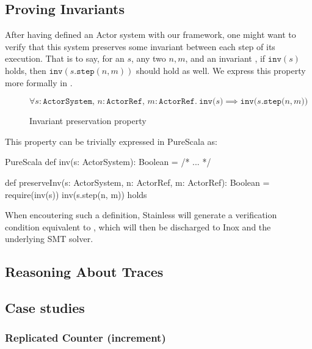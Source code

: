 \subsection{Proving Invariants}
\label{invariants}

After having defined an Actor system with our framework, one might want to verify that this 
system preserves some invariant between each step of its execution. That is to say, 
for an  $s$, any two \ActorRef $n, m$,
and an invariant , if $\texttt{inv}(s)$ holds, 
then $\texttt{inv}(s\texttt{.step}(n, m))$ should hold as well. We express this 
property more formally in .

\begin{figure}[!h]
$$\forall s: \texttt{ActorSystem},\, n: \texttt{ActorRef},\, m: \texttt{ActorRef}.\ \texttt{inv($s$)} \implies \texttt{inv($s$.step($n, m$))}$$
\vspace{-20pt}
\caption{Invariant preservation property\label{fig:stepinvariant}}
\end{figure}

This property can be trivially expressed in PureScala as:

\begin{ShortCode}{PureScala}
def inv(s: ActorSystem): Boolean = {
  /* ... */
}

def preserveInv(s: ActorSystem, n: ActorRef, m: ActorRef): Boolean = {
  require(inv(s))
  inv(s.step(n, m))
} holds
\end{ShortCode}

When encoutering such a definition, Stainless will generate a verification condition 
equivalent to , which will then be discharged to Inox and the underlying SMT solver.

\subsection{Reasoning About Traces}
\label{traces}


\subsection{Case studies}
\label{casestudies}

\subsubsection*{Replicated Counter (increment)}

